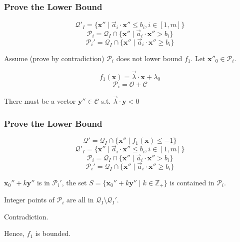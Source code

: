 \documentclass[11pt]{beamer}
\begin{document}
\begin{frame}
\frametitle{Prove the Lower Bound}

\[\mathcal{Q}'_I = \{\textbf{x}'' \mid \vec{a}_i\cdot \textbf{x}'' \le b_i, i \in [1, m]\}\]
\[\mathcal{P}_i = \mathcal{Q}_I \cap \{\textbf{x}''\mid \vec{a}_i \cdot \textbf{x}'' > b_i\}\]
\[\mathcal{P}_i' = \mathcal{Q}_I \cap \{\textbf{x}''\mid \vec{a}_i \cdot \textbf{x}'' \ge b_i\}\]




Assume (prove by contradiction) $\mathcal{P}_i$ does not lower bound $f_1$.
Let $\textbf{x}''_0\in \mathcal{P}_i$.

\[f_1(\textbf{x}) = \vec{\lambda}\cdot \textbf{x} + \lambda_0 \]
\[\mathcal{P}_i = \mathcal{O} + \mathcal{C}\]

There must be a vector $\textbf{y}''\in \mathcal{C}$ s.t. $\vec{\lambda}\cdot \textbf{y}  < 0$


\end{frame}

\begin{frame}\frametitle{Prove the Lower Bound}

\[\mathcal{Q}' = \mathcal{Q}_I\cap \{\textbf{x}''\mid f_1(\textbf{x}) \le -1\}\]
\[\mathcal{Q}'_I = \{\textbf{x}'' \mid \vec{a}_i\cdot \textbf{x}'' \le b_i, i \in [1, m]\}\]
\[\mathcal{P}_i = \mathcal{Q}_I \cap \{\textbf{x}''\mid \vec{a}_i \cdot \textbf{x}'' > b_i\}\]
\[\mathcal{P}_i' = \mathcal{Q}_I \cap \{\textbf{x}''\mid \vec{a}_i \cdot \textbf{x}'' \ge b_i\}\]

$\textbf{x}_0'' + k\textbf{y}''$ is in $\mathcal{P}_i'$, the set $S = \{\textbf{x}_0'' + k\textbf{y}''\mid k \in \mathbb{Z}_+\}$ is contained in $\mathcal{P}_i$.

Integer points of $\mathcal{P}_i$ are all in $\mathcal{Q}_I\setminus \mathcal{Q}_I'$.

Contradiction.

Hence, $f_1$ is bounded.
\end{frame}
\end{document}
